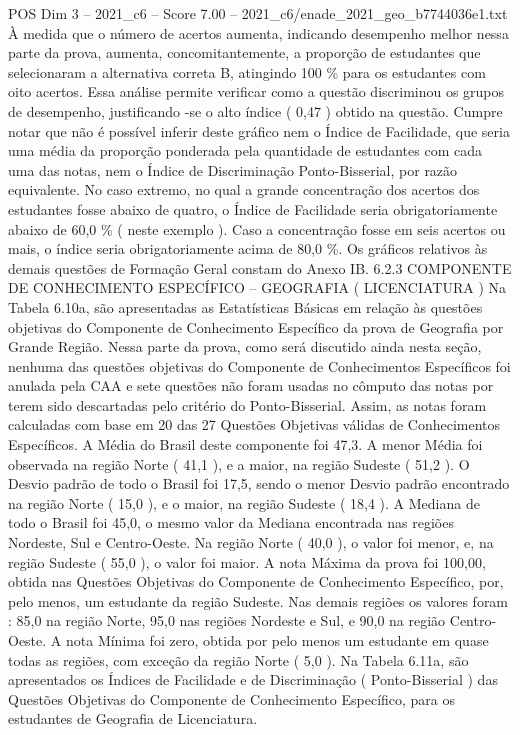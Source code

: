 \begin{textsample}{POS Dim 3 – 2021\_c6 – Score 7.00 – 2021\_c6/enade\_2021\_geo\_b7744036e1.txt}
À medida que o número de acertos aumenta, indicando desempenho melhor nessa parte da prova, aumenta, concomitantemente, a proporção de estudantes que selecionaram a alternativa correta B, atingindo 100 \% para os estudantes com oito acertos.
Essa análise permite verificar como a questão discriminou os grupos de desempenho, justificando -se o alto índice ( 0,47 ) obtido na questão.
Cumpre notar que não é possível inferir deste gráfico nem o Índice de Facilidade, que seria uma média da proporção ponderada pela quantidade de estudantes com cada uma das notas, nem o Índice de Discriminação Ponto-Bisserial, por razão equivalente.
No caso extremo, no qual a grande concentração dos acertos dos estudantes fosse abaixo de quatro, o Índice de Facilidade seria obrigatoriamente abaixo de 60,0 \% ( neste exemplo ).
Caso a concentração fosse em seis acertos ou mais, o índice seria obrigatoriamente acima de 80,0 \%.
Os gráficos relativos às demais questões de Formação Geral constam do Anexo IB. 6.2.3 COMPONENTE DE CONHECIMENTO ESPECÍFICO – GEOGRAFIA ( LICENCIATURA ) Na Tabela 6.10a, são apresentadas as Estatísticas Básicas em relação às questões objetivas do Componente de Conhecimento Específico da prova de Geografia por Grande Região.
Nessa parte da prova, como será discutido ainda nesta seção, nenhuma das questões objetivas do Componente de Conhecimentos Específicos foi anulada pela CAA e sete questões não foram usadas no cômputo das notas por terem sido descartadas pelo critério do Ponto-Bisserial.
Assim, as notas foram calculadas com base em 20 das 27 Questões Objetivas válidas de Conhecimentos Específicos.
A Média do Brasil deste componente foi 47,3.
A menor Média foi observada na região Norte ( 41,1 ), e a maior, na região Sudeste ( 51,2 ).
O Desvio padrão de todo o Brasil foi 17,5, sendo o menor Desvio padrão encontrado na região Norte ( 15,0 ), e o maior, na região Sudeste ( 18,4 ).
A Mediana de todo o Brasil foi 45,0, o mesmo valor da Mediana encontrada nas regiões Nordeste, Sul e Centro-Oeste.
Na região Norte ( 40,0 ), o valor foi menor, e, na região Sudeste ( 55,0 ), o valor foi maior.
A nota Máxima da prova foi 100,00, obtida nas Questões Objetivas do Componente de Conhecimento Específico, por, pelo menos, um estudante da região Sudeste.
Nas demais regiões os valores foram : 85,0 na região Norte, 95,0 nas regiões Nordeste e Sul, e 90,0 na região Centro-Oeste.
A nota Mínima foi zero, obtida por pelo menos um estudante em quase todas as regiões, com exceção da região Norte ( 5,0 ).
Na Tabela 6.11a, são apresentados os Índices de Facilidade e de Discriminação ( Ponto-Bisserial ) das Questões Objetivas do Componente de Conhecimento Específico, para os estudantes de Geografia de Licenciatura.

\end{textsample}
